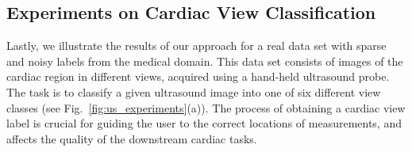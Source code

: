 \subsection{Experiments on Cardiac View Classification}
Lastly, we illustrate the results of our approach for a real data set with sparse and noisy labels from the medical domain. This data set consists of images of the cardiac region in different views, acquired using a hand-held ultrasound probe. The task is to classify a given ultrasound image into one of six different view classes (see Fig.~\ref{fig:us_experiments}(a)). The process of obtaining a cardiac view label is crucial for guiding the user to the correct locations of measurements, and affects the quality of the downstream cardiac tasks. 

\label{sec:us_experiments}
